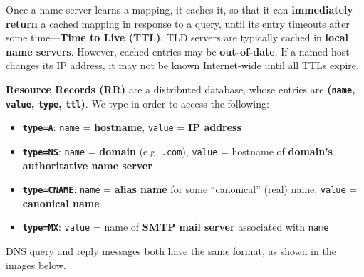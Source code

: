 \documentclass[12pt,a4paper]{article}
\begin{document}

\noindent Once a name server learns a mapping, it caches it, so that it can \textbf{immediately return} a cached mapping in response to a query, until its entry timeouts after some time---\textbf{Time to Live (TTL)}. TLD servers are typically cached in \textbf{local name servers}. However, cached entries may be \textbf{out-of-date}. If a named host changes its IP address, it may not be known Internet-wide until all TTLs expire. \\


\noindent \textbf{Resource Records (RR)} are a distributed database, whose entries are \textbf{(\texttt{name}, \texttt{value}, \texttt{type}, \texttt{ttl})}. We type  in order to access the following:

\begin{itemize}
  \item \textbf{\texttt{type=A}}: \texttt{name} = \textbf{hostname}, \texttt{value} = \textbf{IP address}
  \item \textbf{\texttt{type=NS}}: \texttt{name} = \textbf{domain} (e.g. \texttt{.com}), \texttt{value} = hostname of \textbf{domain's authoritative name server}
  \item \textbf{\texttt{type=CNAME}}: \texttt{name} = \textbf{alias name} for some ``canonical'' (real) name, \texttt{value} = \textbf{canonical name}
  \item \textbf{\texttt{type=MX}}: \texttt{value} = name of \textbf{SMTP mail server} associated with \texttt{name}
\end{itemize}


\noindent DNS query and reply messages both have the same format, as shown in the images below.
\end{document}

